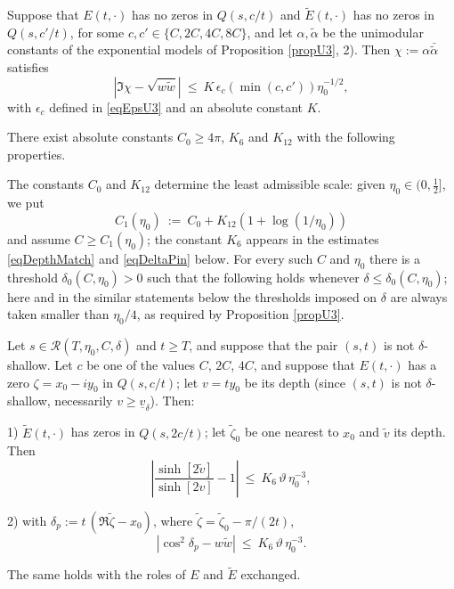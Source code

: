 \documentclass[10pt,a4paper]{amsart}
\def\RR{{\mathcal{R}}}
\def\a{\alpha}
\def\d{\delta}
\def\ti{\tilde}
\def\uv{\underline{v}_{\d}}
\begin{document}
\begin{lemma}\label{lemChi}
Suppose that $E(t,\cdot)$ has no zeros in $Q(s,c/t)$ and $\ti E(t,\cdot)$ has no zeros in $Q(s,c'/t)$, for some $c,c'\in\{C,2C,4C,8C\}$, and let $\a,\ti\a$ be the unimodular constants of the exponential models of Proposition \ref{propU3}, 2). Then $\chi:=\a\bar{\ti\a}$ satisfies
$$\left|\Im\chi-\sqrt{w\ti w}\right|\ \leq\ K\,\epsilon_c\!\left(\min(c,c')\right)\eta_0^{-1/2},$$
with $\epsilon_c$ defined in \eqref{eqEpsU3} and an absolute constant $K$.
\end{lemma}

\begin{lemma}[pairing]\label{lemPair}
There exist absolute constants $C_0\geq4\pi$, $K_6$ and $K_{12}$ with the following properties.

The constants $C_0$ and $K_{12}$ determine the least admissible scale: given $\eta_0\in(0,\tfrac12]$, we put
$$C_1(\eta_0)\ :=\ C_0+K_{12}\left(1+\log(1/\eta_0)\right)$$
and assume $C\geq C_1(\eta_0)$; the constant $K_6$ appears in the estimates \eqref{eqDepthMatch} and \eqref{eqDeltaPin} below. For every such $C$ and $\eta_0$ there is a threshold $\d_0(C,\eta_0)>0$ such that the following holds whenever $\d\leq\d_0(C,\eta_0)$; here and in the similar statements below the thresholds imposed on $\d$ are always taken smaller than $\eta_0/4$, as required by Proposition \ref{propU3}.

Let $s\in\RR(T,\eta_0,C,\d)$ and $t\geq T$, and suppose that the pair $(s,t)$ is not $\d$-shallow. Let $c$ be one of the values $C$, $2C$, $4C$, and suppose that $E(t,\cdot)$ has a zero $\zeta=x_0-iy_0$ in $Q(s,c/t)$; let $v=ty_0$ be its depth (since $(s,t)$ is not $\d$-shallow, necessarily $v\geq\uv$). Then:

1) $\ti E(t,\cdot)$ has zeros in $Q(s,2c/t)$; let $\ti\zeta_0$ be one nearest to $x_0$ and $\ti v$ its depth. Then
\begin{equation}
\left|\frac{\sinh[2\ti v]}{\sinh[2v]}-1\right|\ \leq\ K_6\,\vartheta\,\eta_0^{-3},
\label{eqDepthMatch}
\end{equation}

2) with $\d_p:=t\,(\Re\ti\zeta-x_0)$, where $\ti\zeta=\ti\zeta_0-\pi/(2t)$,
\begin{equation}
\left|\cos^2\d_p-w\ti w\right|\ \leq\ K_6\,\vartheta\,\eta_0^{-3}.
\label{eqDeltaPin}
\end{equation}

The same holds with the roles of $E$ and $\ti E$ exchanged.
\end{lemma}
\end{document}
